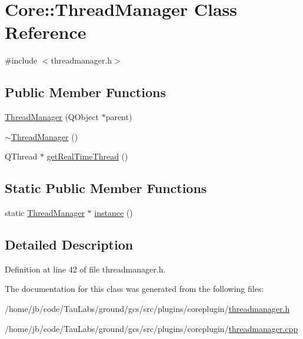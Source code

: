 \hypertarget{class_core_1_1_thread_manager}{\section{\-Core\-:\-:\-Thread\-Manager \-Class \-Reference}
\label{class_core_1_1_thread_manager}
}


{\ttfamily \#include $<$threadmanager.\-h$>$}

\subsection*{\-Public \-Member \-Functions}
\begin{DoxyCompactItemize}
\item 
\hyperlink{group___core_plugin_ga4695f2194bf91085621507eddc07e314}{\-Thread\-Manager} (\-Q\-Object $\ast$parent)
\item 
\hyperlink{group___core_plugin_ga18eb12d3d752075318c3672c8efffd5b}{$\sim$\-Thread\-Manager} ()
\item 
\-Q\-Thread $\ast$ \hyperlink{group___core_plugin_ga49136d4285faaba80634919c6ebba8fc}{get\-Real\-Time\-Thread} ()
\end{DoxyCompactItemize}
\subsection*{\-Static \-Public \-Member \-Functions}
\begin{DoxyCompactItemize}
\item 
static \hyperlink{class_core_1_1_thread_manager}{\-Thread\-Manager} $\ast$ \hyperlink{group___core_plugin_gae7f841ce9120f38b646d3fb68823c871}{instance} ()
\end{DoxyCompactItemize}


\subsection{\-Detailed \-Description}


\-Definition at line 42 of file threadmanager.\-h.



\-The documentation for this class was generated from the following files\-:\begin{DoxyCompactItemize}
\item 
/home/jb/code/\-Tau\-Labs/ground/gcs/src/plugins/coreplugin/\hyperlink{threadmanager_8h}{threadmanager.\-h}\item 
/home/jb/code/\-Tau\-Labs/ground/gcs/src/plugins/coreplugin/\hyperlink{threadmanager_8cpp}{threadmanager.\-cpp}\end{DoxyCompactItemize}
